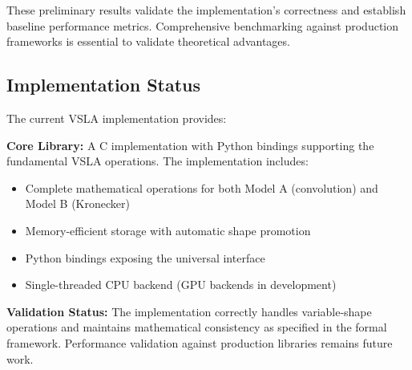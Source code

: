 These preliminary results validate the implementation's correctness and establish baseline performance metrics. Comprehensive benchmarking against production frameworks is essential to validate theoretical advantages.

\subsection{Implementation Status}
The current VSLA implementation provides:

\textbf{Core Library:} A C implementation with Python bindings supporting the fundamental VSLA operations. The implementation includes:
\begin{itemize}[leftmargin=1.5em]
\item Complete mathematical operations for both Model A (convolution) and Model B (Kronecker)
\item Memory-efficient storage with automatic shape promotion
\item Python bindings exposing the universal interface
\item Single-threaded CPU backend (GPU backends in development)
\end{itemize}

\textbf{Validation Status:} The implementation correctly handles variable-shape operations and maintains mathematical consistency as specified in the formal framework. Performance validation against production libraries remains future work.
